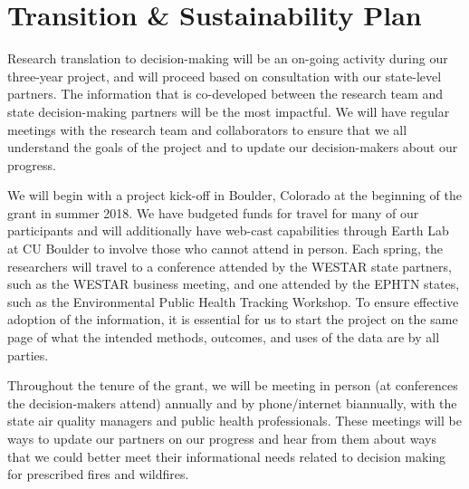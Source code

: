 \documentclass[authoryear]{elsarticle}
\begin{document}
\section{Transition \& Sustainability Plan}

Research translation to decision-making will be an on-going activity during our three-year project, and will proceed based on consultation with our state-level partners. The information that is co-developed between the research team and state decision-making partners will be the most impactful. We will have regular meetings with the research team and collaborators to ensure that we all understand the goals of the project and to update our decision-makers about our progress. 

We will begin with a project kick-off in Boulder, Colorado at the beginning of the grant in summer 2018. We have budgeted funds for travel for many of our participants and will additionally have web-cast capabilities through Earth Lab at CU Boulder to involve those who cannot attend in person. Each spring, the researchers will travel to a conference attended by the WESTAR state partners, such as the WESTAR business meeting, and one attended by the EPHTN states, such as the Environmental Public Health Tracking Workshop. To ensure effective adoption of the information, it is essential for us to start the project on the same page of what the intended methods, outcomes, and uses of the data are by all parties. 

Throughout the tenure of the grant, we will be meeting in person (at conferences the decision-makers attend) annually and by phone/internet biannually, with the state air quality managers and public health professionals. These meetings will be ways to update our partners on our progress and hear from them about ways that we could better meet their informational needs related to decision making for prescribed fires and wildfires. 
\end{document}
